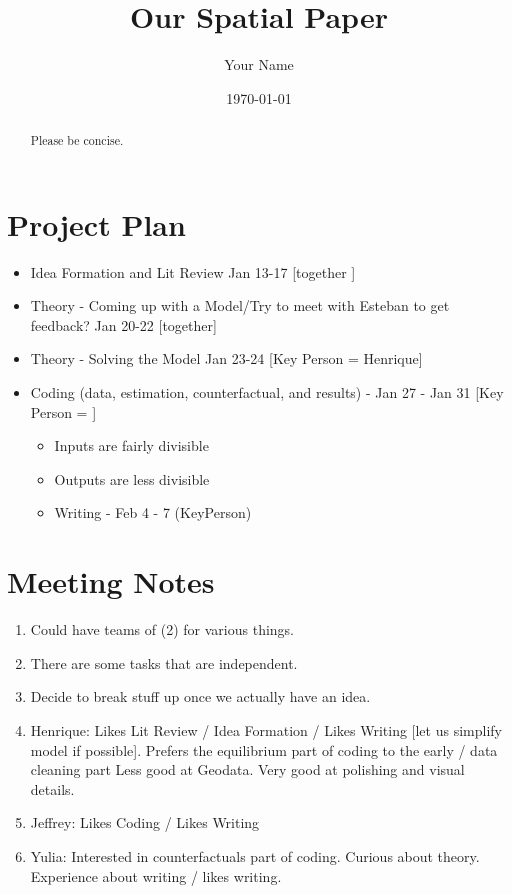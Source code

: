 \documentclass{article}
\title{Our Spatial Paper}
\author{Your Name}
\date{\today}
\begin{document}
\maketitle

\begin{abstract}
    Please be concise.
\end{abstract}

\section{Project Plan}
\begin{itemize}
    \item Idea Formation and Lit Review  Jan 13-17  [together ]
    \item Theory - Coming up with a Model/Try to meet with Esteban to get feedback? Jan 20-22 [together]
    \item Theory - Solving the Model Jan 23-24 [Key Person = Henrique]
    \item Coding (data, estimation, counterfactual, and results) - Jan 27 - Jan 31  [Key Person = ]
    \begin{itemize}
        \item Inputs are fairly divisible
        \item Outputs are less divisible
        \item Writing -  Feb 4 - 7  (KeyPerson)
   \end{itemize}
\end{itemize}
\section{Meeting Notes}
\begin{enumerate}
    \item  Could have teams of (2) for various things. 
    \item There are some tasks that are independent. 
    \item Decide to break stuff up once we actually have an idea.
    \item Henrique: Likes Lit Review / Idea Formation / Likes Writing [let us simplify model if possible]. Prefers the equilibrium part of coding to the early / data cleaning part Less good at Geodata.  Very good at polishing and visual details. 
    \item Jeffrey: Likes Coding / Likes Writing
    \item Yulia: Interested in counterfactuals part of coding. Curious about theory. Experience about writing / likes writing. 
\end{enumerate}
\end{document}
